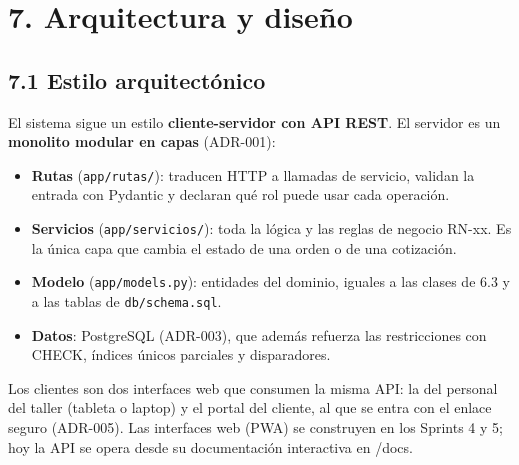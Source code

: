 \section{7. Arquitectura y diseño}\label{arquitectura-y-diseuxf1o}

\subsection{7.1 Estilo arquitectónico}\label{estilo-arquitectuxf3nico}

El sistema sigue un estilo \textbf{cliente-servidor con API REST}. El servidor es un \textbf{monolito
modular en capas} (ADR-001):

\begin{itemize}
\tightlist
\item \textbf{Rutas} (\texttt{app/rutas/}): traducen HTTP a llamadas de servicio, validan la entrada con
Pydantic y declaran qué rol puede usar cada operación.
\item \textbf{Servicios} (\texttt{app/servicios/}): toda la lógica y las reglas de negocio RN-xx. Es la
única capa que cambia el estado de una orden o de una cotización.
\item \textbf{Modelo} (\texttt{app/models.py}): entidades del dominio, iguales a las clases de 6.3 y a las
tablas de \texttt{db/schema.sql}.
\item \textbf{Datos}: PostgreSQL (ADR-003), que además refuerza las restricciones con CHECK, índices únicos
parciales y disparadores.
\end{itemize}

Los clientes son dos interfaces web que consumen la misma API: la del personal del taller (tableta o
laptop) y el portal del cliente, al que se entra con el enlace seguro (ADR-005).
Las interfaces web (PWA) se construyen en los Sprints 4 y 5; hoy la API se opera desde su
documentación interactiva en /docs.

